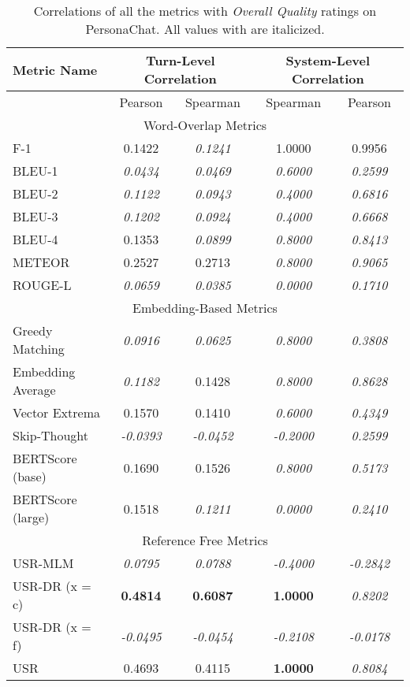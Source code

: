 \documentclass[11pt,a4paper]{article}
\begin{document}
\begin{table*}
    \centering
    \renewcommand*{\arraystretch}{1.2}
    \begin{tabular}{|l|c|c|c|c|}
    \hline
        \textbf{Metric Name} & \multicolumn{2}{|c|}{\textbf{Turn-Level Correlation}} & \multicolumn{2}{|c|}{\textbf{System-Level Correlation}}  \\ \hline
         & Pearson & Spearman & Spearman & Pearson \\ \hline
         \multicolumn{5}{|c|}{Word-Overlap Metrics} \\ \hline
F-1 & 0.1422 & \textit{0.1241} & 1.0000 & 0.9956 \\
BLEU-1 & \textit{0.0434} & \textit{0.0469} & \textit{0.6000} & \textit{0.2599} \\
BLEU-2 & \textit{0.1122} & \textit{0.0943} & \textit{0.4000} & \textit{0.6816} \\
BLEU-3 & \textit{0.1202} & \textit{0.0924} & \textit{0.4000} & \textit{0.6668} \\
BLEU-4 & 0.1353 & \textit{0.0899} & \textit{0.8000} & \textit{0.8413} \\
METEOR & 0.2527 & 0.2713 & \textit{0.8000} & \textit{0.9065} \\
ROUGE-L & \textit{0.0659} & \textit{0.0385} & \textit{0.0000} & \textit{0.1710} \\\hline 
 \multicolumn{5}{|c|}{Embedding-Based Metrics} \\ \hline
Greedy Matching & \textit{0.0916} & \textit{0.0625} & \textit{0.8000} & \textit{0.3808} \\
Embedding Average & \textit{0.1182} & 0.1428 & \textit{0.8000} & \textit{0.8628} \\
Vector Extrema & 0.1570 & 0.1410 & \textit{0.6000} & \textit{0.4349} \\
Skip-Thought & \textit{-0.0393} & \textit{-0.0452} & \textit{-0.2000} & \textit{0.2599} \\
BERTScore (base) & 0.1690 & 0.1526 & \textit{0.8000} & \textit{0.5173} \\
BERTScore (large) & 0.1518 & \textit{0.1211} & \textit{0.0000} & \textit{0.2410} \\\hline 
 \multicolumn{5}{|c|}{Reference Free Metrics} \\ \hline
USR-MLM & \textit{0.0795} & \textit{0.0788} & \textit{-0.4000} & \textit{-0.2842} \\
USR-DR (x = c) & \textbf{0.4814} & \textbf{0.6087} & \textbf{1.0000} & \textit{0.8202} \\
USR-DR (x = f) & \textit{-0.0495} & \textit{-0.0454} & \textit{-0.2108} & \textit{-0.0178} \\
USR & 0.4693 & 0.4115 & \textbf{1.0000} & \textit{0.8084} \\\hline
    \end{tabular}
    \caption{Correlations of all the metrics with \textit{Overall Quality} ratings on PersonaChat. All values with  are italicized.}
    
\end{table*}
\end{document}
